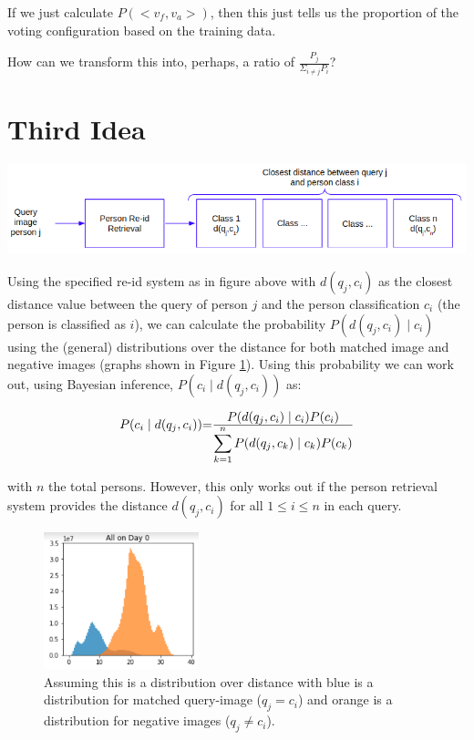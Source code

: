 \documentclass[10pt,a4paper,final]{article}
\begin{document}
If we just calculate $P(<v_f, v_a>)$, then this just tells us the proportion of the voting configuration based on the training data.

How can we transform this into, perhaps, a ratio of $\displaystyle\frac{P_j}{\Sigma_{i \neq j} P_i}$? 

\section{Third Idea}

\includegraphics[width=\textwidth]{figures/third_idea.png}

Using the specified re-id system as in figure above with $d(q_j, c_i)$ as the closest distance value between the query of person $j$ and the person classification $c_i$ (the person is classified as $i$), we can calculate the probability $P(d(q_j, c_i) \mid c_i)$ using the (general) distributions over the distance for both matched image and negative images (graphs shown in Figure \ref{fig:match_mismatch_dist}). Using this probability we can work out, using Bayesian inference, $P(c_i \mid d(q_j, c_i))$ as:

\begin{equation}
	\label{eq:third_idea}
	\begin{tabular}{r@{=}l}
		$P(c_i \mid d(q_j, c_i))$ & $\frac{\displaystyle P(d(q_j, c_i) \mid c_i) P(c_i)}{\displaystyle\sum_{k=1}^{n} P(d(q_j, c_k) \mid c_k) P(c_k)}$ \\ 
	\end{tabular}
\end{equation}

\noindent with $n$ the total persons. However, this only works out if the person retrieval system provides the distance $d(q_j, c_i)$ for all $1 \leq i \leq n$ in each query.

\begin{figure}
	\centering
	\includegraphics[width=0.40\textwidth]{./figures/match_mismatch_dist.png}
	\caption{Assuming this is a distribution over distance with blue is a distribution for matched query-image ($q_j = c_i$) and orange is a distribution for negative images ($q_j \neq c_i$).}
	\label{fig:match_mismatch_dist}
\end{figure}
\end{document}
